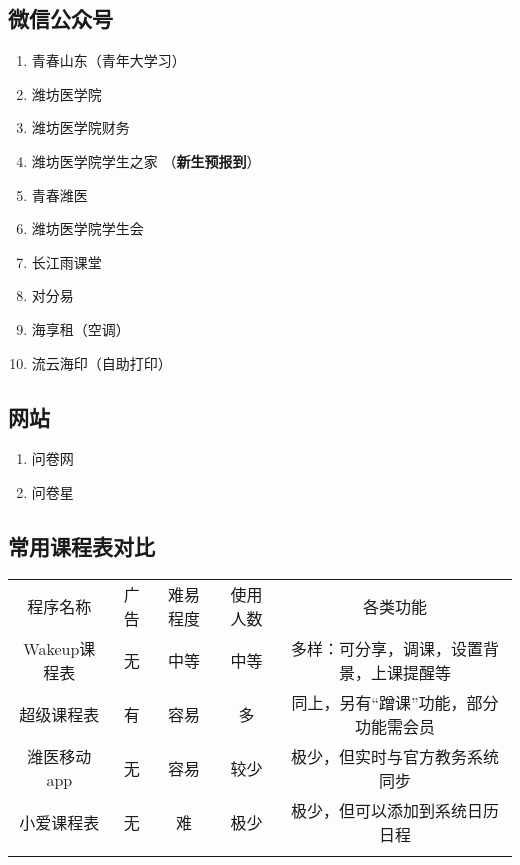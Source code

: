 {\begin{minipage}{0.42\textwidth}
        \subsection[微信公众号]{微信公众号}
        \begin{enumerate}
            \item 青春山东（青年大学习）
            \item 潍坊医学院
            \item 潍坊医学院财务
            \item 潍坊医学院学生之家
                  （\textbf{新生预报到}）
            \item 青春潍医
            \item 潍坊医学院学生会
            \item 长江雨课堂
            \item 对分易
            \item 海享租（空调）
            \item 流云海印（自助打印）
        \end{enumerate}

        \subsection[网站]{网站}
        \begin{enumerate}
            \item 问卷网
            \item 问卷星
        \end{enumerate}
    \end{minipage}
}
\vspace*{1.5em}
\subsection[常用课程表对比]{常用课程表对比}
\label{schedule}
\begin{table}[!ht]
    \centering
    \begin{tabular}{|c|c|c|c|c|}
        \Xhline{1.2pt}
        程序名称      & 广告 & 难易程度 & 使用人数 & 各类功能                 \\
        \Xhline{1.2pt}
        Wakeup课程表 & 无  & 中等   & 中等   & 多样：可分享，调课，设置背景，上课提醒等 \\
        \hline
        超级课程表     & 有  & 容易   & 多    & 同上，另有“蹭课”功能，部分功能需会员  \\
        \hline
        潍医移动app   & 无  & 容易   & 较少   & 极少，但实时与官方教务系统同步      \\
        \hline
        小爱课程表     & 无  & 难    & 极少   & 极少，但可以添加到系统日历日程      \\
        \Xhline{1.2pt}
    \end{tabular}
\end{table}

